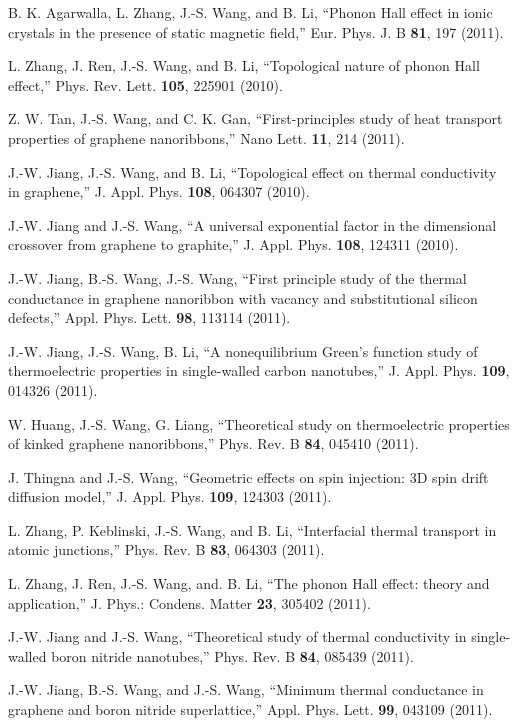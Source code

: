 \itm B. K. Agarwalla, L. Zhang, J.-S. Wang, and B. Li, 
``Phonon Hall effect in ionic crystals in the presence of static 
magnetic field,'' Eur. Phys. J. B {\bf 81}, 197 (2011).

\itm L. Zhang, J. Ren, J.-S. Wang, and B. Li, 
``Topological nature of phonon Hall effect,'' 
Phys. Rev. Lett. {\bf 105}, 225901 (2010).

\itm Z. W. Tan, J.-S. Wang, and C. K. Gan, 
``First-principles study of heat transport properties of graphene 
nanoribbons,'' Nano Lett. {\bf 11}, 214 (2011).

\itm J.-W. Jiang, J.-S. Wang, and B. Li, 
``Topological effect on thermal conductivity in graphene,'' 
J. Appl. Phys. {\bf 108}, 064307 (2010).

\itm J.-W. Jiang and J.-S. Wang, 
``A universal exponential factor in the dimensional crossover from 
graphene to graphite,'' J. Appl. Phys. {\bf 108}, 124311 (2010).

\itm J.-W. Jiang, B.-S. Wang, J.-S. Wang, 
``First principle study of the thermal conductance in graphene 
nanoribbon with vacancy and substitutional silicon defects,'' 
Appl. Phys. Lett. {\bf 98}, 113114 (2011).

\itm J.-W. Jiang, J.-S. Wang, B. Li, 
``A nonequilibrium Green's function study of thermoelectric properties 
in single-walled carbon nanotubes,'' J. Appl. Phys. {\bf 109}, 014326 (2011).

\itm W. Huang, J.-S. Wang, G. Liang, 
``Theoretical study on thermoelectric properties of kinked graphene 
nanoribbons,'' Phys. Rev. B {\bf 84}, 045410 (2011).

\itm J. Thingna and J.-S. Wang, 
``Geometric effects on spin injection: 3D spin drift diffusion model,'' 
J. Appl. Phys. {\bf 109}, 124303 (2011).

\itm L. Zhang, P. Keblinski, J.-S. Wang, and B. Li, 
``Interfacial thermal transport in atomic junctions,'' 
Phys. Rev. B {\bf 83}, 064303 (2011).

\itm L. Zhang, J. Ren, J.-S. Wang, and. B. Li, 
``The phonon Hall effect: theory and application,'' 
J. Phys.: Condens. Matter {\bf 23}, 305402 (2011).

\itm J.-W. Jiang and J.-S. Wang, ``Theoretical study of thermal conductivity 
in single-walled boron nitride nanotubes,'' Phys. Rev. B {\bf 84}, 085439 (2011). 

\itm J.-W. Jiang, B.-S. Wang, and J.-S. Wang, ``Minimum thermal conductance 
in graphene and boron nitride superlattice,'' Appl. Phys. Lett. 
{\bf 99}, 043109 (2011). 

